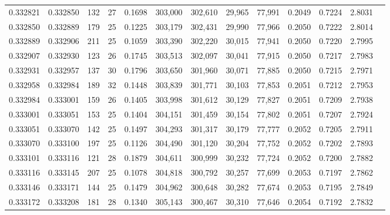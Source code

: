 \begin{tabular}{rrrrrrrrrrrrr}
0.332821 & 0.332850 &   132 &  27 &                                     0.1698 & 303,000 & 302,610 &  29,965 &  77,991 & 0.2049 & 0.7224 & 2.8031 \\
0.332850 & 0.332889 &   179 &  25 &                                     0.1225 & 303,179 & 302,431 &  29,990 &  77,966 & 0.2050 & 0.7222 & 2.8014 \\
0.332889 & 0.332906 &   211 &  25 &                                     0.1059 & 303,390 & 302,220 &  30,015 &  77,941 & 0.2050 & 0.7220 & 2.7995 \\
0.332907 & 0.332930 &   123 &  26 &                                     0.1745 & 303,513 & 302,097 &  30,041 &  77,915 & 0.2050 & 0.7217 & 2.7983 \\
0.332931 & 0.332957 &   137 &  30 &                                     0.1796 & 303,650 & 301,960 &  30,071 &  77,885 & 0.2050 & 0.7215 & 2.7971 \\
0.332958 & 0.332984 &   189 &  32 &                                     0.1448 & 303,839 & 301,771 &  30,103 &  77,853 & 0.2051 & 0.7212 & 2.7953 \\
0.332984 & 0.333001 &   159 &  26 &                                     0.1405 & 303,998 & 301,612 &  30,129 &  77,827 & 0.2051 & 0.7209 & 2.7938 \\
0.333001 & 0.333051 &   153 &  25 &                                     0.1404 & 304,151 & 301,459 &  30,154 &  77,802 & 0.2051 & 0.7207 & 2.7924 \\
0.333051 & 0.333070 &   142 &  25 &                                     0.1497 & 304,293 & 301,317 &  30,179 &  77,777 & 0.2052 & 0.7205 & 2.7911 \\
0.333070 & 0.333100 &   197 &  25 &                                     0.1126 & 304,490 & 301,120 &  30,204 &  77,752 & 0.2052 & 0.7202 & 2.7893 \\
0.333101 & 0.333116 &   121 &  28 &                                     0.1879 & 304,611 & 300,999 &  30,232 &  77,724 & 0.2052 & 0.7200 & 2.7882 \\
0.333116 & 0.333145 &   207 &  25 &                                     0.1078 & 304,818 & 300,792 &  30,257 &  77,699 & 0.2053 & 0.7197 & 2.7862 \\
0.333146 & 0.333171 &   144 &  25 &                                     0.1479 & 304,962 & 300,648 &  30,282 &  77,674 & 0.2053 & 0.7195 & 2.7849 \\
0.333172 & 0.333208 &   181 &  28 &                                     0.1340 & 305,143 & 300,467 &  30,310 &  77,646 & 0.2054 & 0.7192 & 2.7832 \\

\end{tabular}
